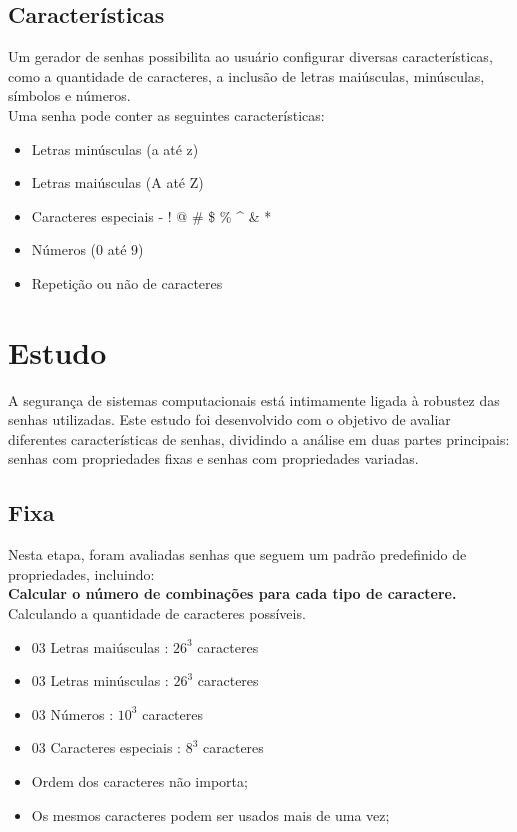 \documentclass{article}
\begin{document}
\subsection{Características}

Um gerador de senhas possibilita ao usuário configurar diversas características, como a quantidade de caracteres, a inclusão de letras maiúsculas, minúsculas, símbolos e números.\\

Uma senha pode conter as seguintes características:

\begin{itemize}
	\item Letras minúsculas (a até z)
	\item Letras maiúsculas (A até Z)
	\item Caracteres especiais - ! @ \# \$ \% \^{} \& *
	\item Números (0 até 9)
	\item Repetição ou não de caracteres
\end{itemize}

\pagebreak

\section{Estudo}

A segurança de sistemas computacionais está intimamente ligada à robustez das senhas utilizadas. Este estudo foi desenvolvido com o objetivo de avaliar diferentes características de senhas, dividindo a análise em duas partes principais: senhas com propriedades fixas e senhas com propriedades variadas.

\subsection{Fixa}

Nesta etapa, foram avaliadas senhas que seguem um padrão predefinido de propriedades, incluindo:\\

\textbf{Calcular o número de combinações para cada tipo de caractere.}\\
Calculando a quantidade de caracteres possíveis.
\begin{itemize}
	\item 03 Letras maiúsculas : $26^3$ caracteres
	\item 03 Letras minúsculas : $26^3$ caracteres
	\item 03 Números : $10^3$ caracteres
	\item 03 Caracteres especiais : $8^3$ caracteres
	\item Ordem dos caracteres não importa;
	\item Os mesmos caracteres podem ser usados mais de uma vez;
\end{itemize}
\end{document}
